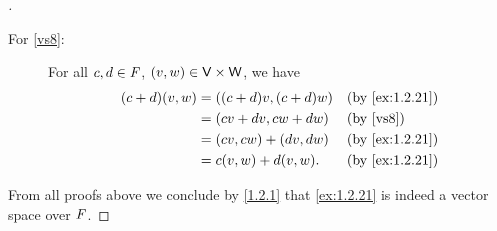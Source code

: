 \begin{proof}[]
\begin{description}
		\item[For \ref{vs8}:]
			For all \(c, d \in \mathit{F}\), \((v, w) \in \mathsf{V} \times \mathsf{W}\), we have
			\begin{align*}
				(c + d) (v, w) & = ((c + d) v, (c + d) w) &  & \text{(by \cref{ex:1.2.21})} \\
				               & = (cv + dv, cw + dw)     &  & \text{(by \ref{vs8})}        \\
				               & = (cv, cw) + (dv, dw)    &  & \text{(by \cref{ex:1.2.21})} \\
				               & = c(v, w) + d(v, w).     &  & \text{(by \cref{ex:1.2.21})}
			\end{align*}
	\end{description}
	From all proofs above we conclude by \cref{1.2.1} that \cref{ex:1.2.21} is indeed a vector space over \(\mathit{F}\).
\end{proof}
